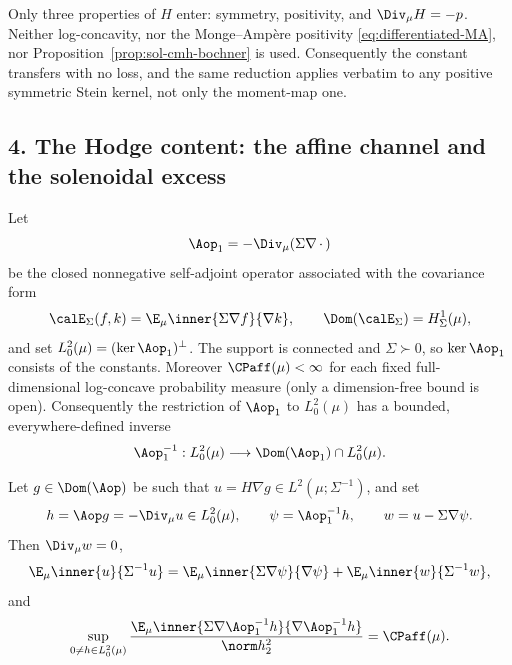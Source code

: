 \documentclass[../main.tex]{subfiles}
\begin{document}
\begin{remark}
Only three properties of $H$ enter: symmetry, positivity, and $\Div_\mu H=-p$. Neither
log-concavity, nor the Monge--Amp\`ere positivity \eqref{eq:differentiated-MA}, nor
Proposition~\ref{prop:sol-cmh-bochner} is used. Consequently the constant transfers with no
loss, and the same reduction applies verbatim to any positive symmetric Stein kernel, not only
the moment-map one.
\end{remark}

\subsection*{4. The Hodge content: the affine channel and the solenoidal excess}

Let
\[
  \Aop_1=-\Div_\mu(\Sigma\nabla\,\cdot\,)
\]
be the closed nonnegative self-adjoint operator associated with the covariance form
\[
  \calE_\Sigma(f,k)=\E_\mu\inner{\Sigma\nabla f}{\nabla k},
  \qquad \Dom(\calE_\Sigma)=H^1_\Sigma(\mu),
\]
and set $L^2_0(\mu)=(\ker\Aop_1)^\perp$.  The support is connected and $\Sigma\succ0$, so
$\ker\Aop_1$ consists of the constants.  Moreover $\CPaff(\mu)<\infty$ for each fixed
full-dimensional log-concave probability measure (only a dimension-free bound is open).
Consequently the restriction of $\Aop_1$ to $L^2_0(\mu)$ has a bounded, everywhere-defined
inverse
\begin{equation}
  \Aop_1^{-1}:L^2_0(\mu)\longrightarrow
  \Dom(\Aop_1)\cap L^2_0(\mu).
  \label{eq:sol-cmh-a1-inverse}
\end{equation}

\begin{proposition}[= Proposition~\ref{prop:cmh-hodge}]
\label{prop:sol-cmh-hodge}
Let $g\in\Dom(\Aop)$ be such that
$u=H\nabla g\in L^2(\mu;\Sigma^{-1})$, and set
\[
  h=\Aop g=-\Div_\mu u\in L^2_0(\mu),\qquad
  \psi=\Aop_1^{-1}h,\qquad
  w=u-\Sigma\nabla\psi.
\]
Then $\Div_\mu w=0$,
\[
  \E_\mu\inner{u}{\Sigma^{-1}u}
  =\E_\mu\inner{\Sigma\nabla\psi}{\nabla\psi}+\E_\mu\inner{w}{\Sigma^{-1}w},
\]
and
\[
  \sup_{0\ne h\in L^2_0(\mu)}
  \frac{\E_\mu\inner{\Sigma\nabla\Aop_1^{-1}h}
                         {\nabla\Aop_1^{-1}h}}
       {\norm h_2^2}
  =\CPaff(\mu).
\]
\end{proposition}
\end{document}
